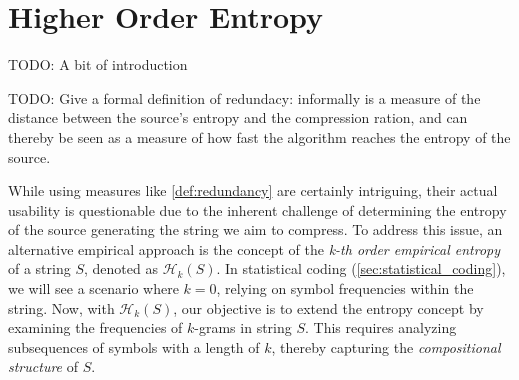\clearpage
\section{Higher Order Entropy} \label{sec:higher_order_entropy}

TODO: A bit of introduction
\begin{definition}[Redundacy] \label{def:redundancy}
    TODO: Give a formal definition of redundacy: informally is a measure of the distance between the source's entropy and the compression ration, and can thereby be seen as a measure of how fast the algorithm reaches the entropy of the source.
\end{definition}


\noindent While using measures like \ref{def:redundancy} are certainly intriguing, their actual usability is questionable due to the inherent challenge of determining the entropy of the source generating the string we aim to compress. To address this issue, an alternative empirical approach is the concept of the \emph{k-th order empirical entropy} of a string $S$, denoted as $\mathcal{H}_k(S)$. In statistical coding (\autoref{sec:statistical_coding}), we will see a scenario where $k=0$, relying on symbol frequencies within the string. Now, with $\mathcal{H}_k(S)$, our objective is to extend the entropy concept by examining the frequencies of $k$-grams in string $S$. This requires analyzing subsequences of symbols with a length of $k$, thereby capturing the \emph{compositional structure} of $S$. \cite{ferragina2023pearls} \vspace{0.4cm}

